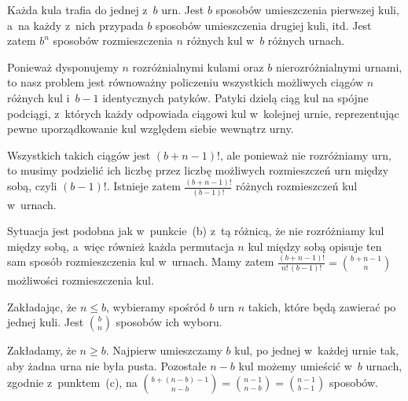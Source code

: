 \subproblem %
Każda kula trafia do jednej z~$b$ urn. Jest $b$ sposobów umieszczenia pierwszej kuli, a~na każdy z~nich przypada $b$ sposobów umieszczenia drugiej kuli, itd. Jest zatem $b^n$ sposobów rozmieszczenia $n$ różnych kul w~$b$ różnych urnach.

\subproblem %
Ponieważ dysponujemy $n$ rozróżnialnymi kulami oraz $b$ nierozróżnialnymi urnami, to nasz problem jest równoważny policzeniu wszystkich możliwych ciągów $n$ różnych kul i~$b-1$ identycznych patyków. Patyki dzielą ciąg kul na spójne podciągi, z~których każdy odpowiada ciągowi kul w~kolejnej urnie, reprezentując pewne uporządkowanie kul względem siebie wewnątrz urny.

Wszystkich takich ciągów jest $(b+n-1)!$, ale ponieważ nie rozróżniamy urn, to musimy podzielić ich liczbę przez liczbę możliwych rozmieszczeń urn między sobą, czyli $(b-1)!$. Istnieje zatem $\frac{(b+n-1)!}{(b-1)!}$ różnych rozmieszczeń kul w~urnach.

\subproblem %
Sytuacja jest podobna jak w~punkcie~(b) z~tą różnicą, że nie rozróżniamy kul między sobą, a~więc również każda permutacja $n$ kul między sobą opisuje ten sam sposób rozmieszczenia kul w~urnach. Mamy zatem $\frac{(b+n-1)!}{n!\,(b-1)!}=\binom{b+n-1}{n}$ możliwości rozmieszczenia kul.

\subproblem %
Zakładając, że $n\le b$, wybieramy spośród $b$ urn $n$ takich, które będą zawierać po jednej kuli. Jest $\binom{b}{n}$ sposobów ich wyboru.

\subproblem %
Zakładamy, że $n\ge b$. Najpierw umieszczamy $b$ kul, po jednej w~każdej urnie tak, aby żadna urna nie była pusta. Pozostałe $n-b$ kul możemy umieścić w~$b$ urnach, zgodnie z~punktem~(c), na $\binom{b+(n-b)-1}{n-b}=\binom{n-1}{n-b}=\binom{n-1}{b-1}$ sposobów.

\endinput
